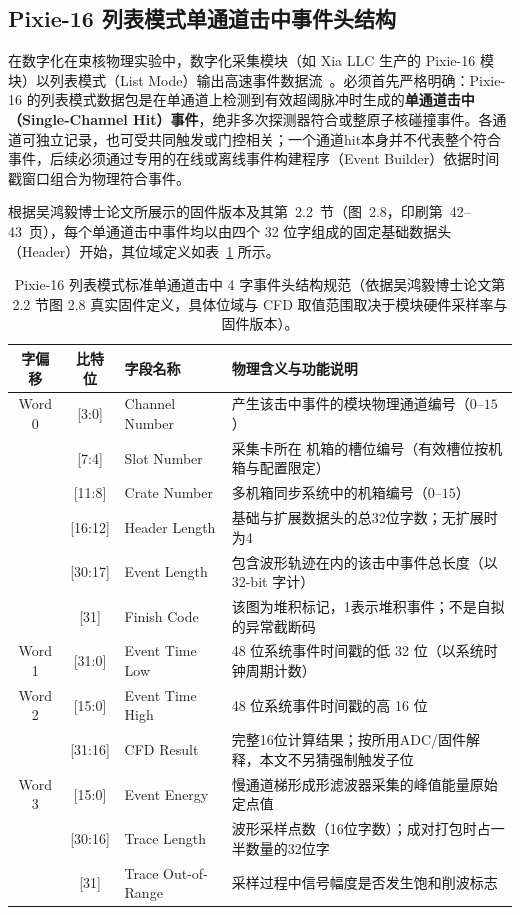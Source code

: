 \subsection{Pixie-16 列表模式单通道击中事件头结构}

在数字化在束核物理实验中，数字化采集模块（如 Xia LLC 生产的 Pixie-16 模块）以列表模式（List Mode）输出高速事件数据流~\cite{wu-hongyi-2020-general-purpose-digital-daq-thesis, doctoral-r1-g32-hennig-2007-pixie16-multi-chassis-sync}。必须首先严格明确：Pixie-16 的列表模式数据包是在单通道上检测到有效超阈脉冲时生成的\textbf{单通道击中（Single-Channel Hit）事件}，绝非多次探测器符合或整原子核碰撞事件。各通道可独立记录，也可受共同触发或门控相关；一个通道hit本身并不代表整个符合事件，后续必须通过专用的在线或离线事件构建程序（Event Builder）依据时间戳窗口组合为物理符合事件。

根据吴鸿毅博士论文所展示的固件版本及其第~2.2~节（图~2.8，印刷第~42--43~页），每个单通道击中事件均以由四个 32 位字组成的固定基础数据头（Header）开始，其位域定义如表~\ref{tab:appE-pixie-header} 所示。

\begin{table}[!htbp]
\centering
\small
\caption{Pixie-16 列表模式标准单通道击中 4 字事件头结构规范（依据吴鸿毅博士论文第 2.2 节图 2.8 真实固件定义，具体位域与 CFD 取值范围取决于模块硬件采样率与固件版本）。}\label{tab:appE-pixie-header}
\begin{tabular}{cclp{7.5cm}}
\toprule
字偏移 & 比特位 & 字段名称 & 物理含义与功能说明 \\
\midrule
Word 0 & [3:0]   & Channel Number    & 产生该击中事件的模块物理通道编号（$0$--$15$） \\
       & [7:4]   & Slot Number       & 采集卡所在 机箱的槽位编号（有效槽位按机箱与配置限定） \\
       & [11:8]  & Crate Number      & 多机箱同步系统中的机箱编号（$0$--$15$） \\
       & [16:12] & Header Length     & 基础与扩展数据头的总32位字数；无扩展时为4 \\
       & [30:17] & Event Length      & 包含波形轨迹在内的该击中事件总长度（以 32-bit 字计） \\
       & [31]    & Finish Code       & 该图为堆积标记，1表示堆积事件；不是自拟的异常截断码 \\
\midrule
Word 1 & [31:0]  & Event Time Low    & 48 位系统事件时间戳的低 32 位（以系统时钟周期计数） \\
\midrule
Word 2 & [15:0]  & Event Time High   & 48 位系统事件时间戳的高 16 位 \\
       & [31:16] & CFD Result & 完整16位计算结果；按所用ADC/固件解释，本文不另猜强制触发子位 \\
\midrule
Word 3 & [15:0]  & Event Energy      & 慢通道梯形成形滤波器采集的峰值能量原始定点值 \\
       & [30:16] & Trace Length      & 波形采样点数（16位字数）；成对打包时占一半数量的32位字 \\
       & [31]    & Trace Out-of-Range& 采样过程中信号幅度是否发生饱和削波标志 \\
\bottomrule
\end{tabular}
\end{table}

